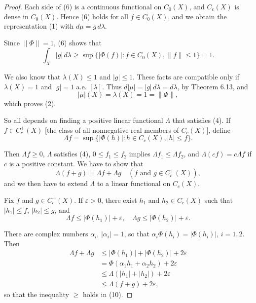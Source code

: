 \begin{proof}
  Each side of (6) is a continuous functional on $C_0(X)$, and $C_c(X)$ is dense in $C_0(X)$. Hence (6) holds for all $f \in C_0(X)$, and we obtain the representation (1) with $d\mu = g \, d\lambda$.

  Since $\|\Phi\| = 1$, (6) shows that
  \begin{equation}
    \int_X |g| \, d\lambda \geq \sup \{|\Phi(f)| : f \in C_0(X), \|f\| \leq 1\} = 1. \tag{7}
  \end{equation}

  We also know that $\lambda(X) \leq 1$ and $|g| \leq 1$. These facts are compatible only if $\lambda(X) = 1$ and $|g| = 1$ a.e. $[\lambda]$. Thus $d|\mu| = |g| \, d\lambda = d\lambda$, by Theorem 6.13, and
  \begin{equation}
    |\mu|(X) = \lambda(X) = 1 = \|\Phi\|, \tag{8}
  \end{equation}
  which proves (2).

  So all depends on finding a positive linear functional $\Lambda$ that satisfies (4). If $f \in C_c^+(X)$ [the class of all nonnegative real members of $C_c(X)$], define
  \begin{equation}
    \Lambda f = \sup \{|\Phi(h)| : h \in C_c(X), |h| \leq f\}. \tag{9}
  \end{equation}

  Then $\Lambda f \geq 0$, $\Lambda$ satisfies (4), $0 \leq f_1 \leq f_2$ implies $\Lambda f_1 \leq \Lambda f_2$, and $\Lambda(cf) = c\Lambda f$ if $c$ is a positive constant. We have to show that
  \begin{equation}
    \Lambda(f + g) = \Lambda f + \Lambda g \quad (f \text{ and } g \in C_c^+(X)), \tag{10}
  \end{equation}
  and we then have to extend $\Lambda$ to a linear functional on $C_c(X)$.

  Fix $f$ and $g \in C_c^+(X)$. If $\varepsilon > 0$, there exist $h_1$ and $h_2 \in C_c(X)$ such that $|h_1| \leq f$, $|h_2| \leq g$, and
  \begin{equation}
    \Lambda f \leq |\Phi(h_1)| + \varepsilon, \quad \Lambda g \leq |\Phi(h_2)| + \varepsilon. \tag{11}
  \end{equation}

  There are complex numbers $\alpha_i$, $|\alpha_i| = 1$, so that $\alpha_i \Phi(h_i) = |\Phi(h_i)|$, $i = 1, 2$. Then
  \begin{align}
    \Lambda f + \Lambda g & \leq |\Phi(h_1)| + |\Phi(h_2)| + 2\varepsilon      \\
                          & = \Phi(\alpha_1 h_1 + \alpha_2 h_2) + 2\varepsilon \\
                          & \leq \Lambda(|h_1| + |h_2|) + 2\varepsilon         \\
                          & \leq \Lambda(f + g) + 2\varepsilon,
  \end{align}
  so that the inequality $\geq$ holds in (10).


\end{proof}
